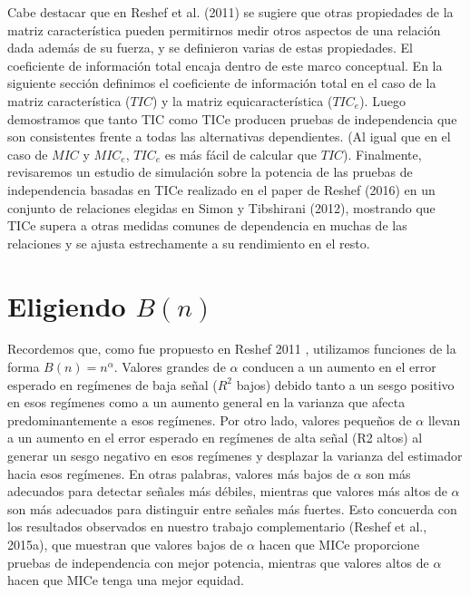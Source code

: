 	Cabe destacar que en Reshef et al. (2011)\cite{Reshef2011} se sugiere que otras propiedades de la matriz caracter\'istica pueden permitirnos medir otros aspectos de una relaci\'on dada adem\'as de su fuerza, y se definieron varias de estas propiedades. El coeficiente de informaci\'on total encaja dentro de este marco conceptual. En la siguiente secci\'on definimos el coeficiente de informaci\'on total en el caso de la matriz caracter\'istica ($TIC$) y la matriz equicaracter\'istica ($TIC_e$). Luego demostramos que tanto TIC como TICe producen pruebas de independencia que son consistentes frente a todas las alternativas dependientes. (Al igual que en el caso de $MIC$ y $MIC_e$, $TIC_e$ es m\'as f\'acil de calcular que $TIC$). Finalmente, revisaremos un estudio de simulaci\'on sobre la potencia de las pruebas de independencia basadas en TICe realizado en el paper de Reshef (2016)\cite{Reshef2016} en un conjunto de relaciones elegidas en Simon y Tibshirani (2012)\cite[]{SimonTibshirani}, mostrando que TICe supera a otras medidas comunes de dependencia en muchas de las relaciones y se ajusta estrechamente a su rendimiento en el resto.



	\section[eligiendo_B(n)]{Eligiendo $B(n)$}
		
	Recordemos que, como fue propuesto en Reshef 2011 \cite{Reshef2011}, utilizamos funciones de la forma $B(n)=n^\alpha$. Valores grandes de $\alpha$ conducen a un aumento en el error esperado en reg\'imenes de baja se\~nal ($R^2$ bajos) debido tanto a un sesgo positivo en esos reg\'imenes como a un aumento general en la varianza que afecta predominantemente a esos reg\'imenes. Por otro lado, valores peque\~nos de $\alpha$ llevan a un aumento en el error esperado en reg\'imenes de alta se\~nal (R2 altos) al generar un sesgo negativo en esos reg\'imenes y desplazar la varianza del estimador hacia esos reg\'imenes. En otras palabras, valores más bajos de $\alpha$ son más adecuados para detectar se\~nales más débiles, mientras que valores más altos de $\alpha$ son más adecuados para distinguir entre se\~nales más fuertes. Esto concuerda con los resultados observados en nuestro trabajo complementario (Reshef et al., 2015a), que muestran que valores bajos de $\alpha$ hacen que MICe proporcione pruebas de independencia con mejor potencia, mientras que valores altos de $\alpha$ hacen que MICe tenga una mejor equidad.
	\newpage
